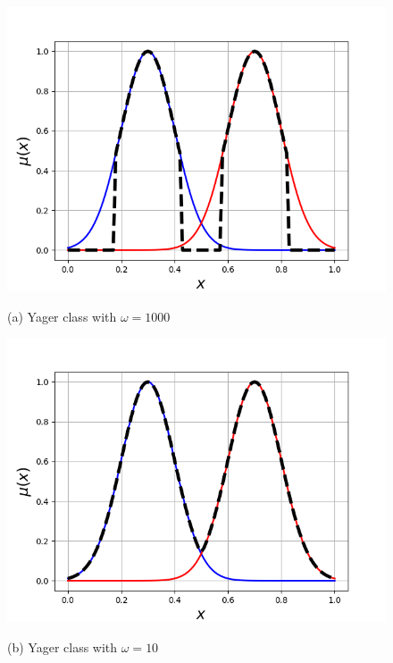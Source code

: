 \documentclass[conference]{IEEEtran}
\begin{document}
\begin{figure}[tb]
	\centering
	\begin{minipage}[t]{0.3\linewidth}
		\centering
		\includegraphics[width=1\textwidth]{Figures/Yager_class_w1000.png}
		\parbox{4cm}{\small \hspace{6.5cm}(a) Yager class with $\omega=1000$}
	\end{minipage}
	\hspace{1ex}
	\begin{minipage}[t]{0.3\linewidth}
		\centering
		\includegraphics[width=1\textwidth]{Figures/Yager_class_w10.png}
		\parbox{4cm}{\small \hspace{5.5cm}(b) Yager class with $\omega=10$}
	\end{minipage}

\end{figure}
\end{document}
